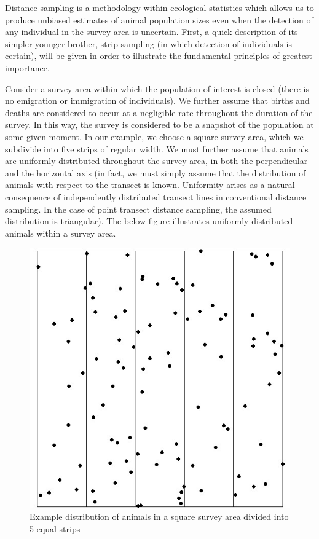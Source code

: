 \documentclass[11pt]{article}
\begin{document}
\begin{multicols}{2}
Distance sampling is a methodology within ecological statistics which allows us to produce unbiased estimates of animal population sizes even when the detection of any individual in the survey area is uncertain. First, a quick description of its simpler younger brother, strip sampling (in which detection of individuals is certain), will be given in order to illustrate the fundamental principles of greatest importance. 

Consider a survey area within which the population of interest is closed (there is no emigration or immigration of individuals). We further assume that births and deaths are considered to occur at a negligible rate throughout the duration of the survey. In this way, the survey is considered to be a snapshot of the population at some given moment. In our example, we choose a square survey area, which we subdivide into five strips of regular width. We must further assume that animals are uniformly distributed throughout the survey area, in both the perpendicular and the horizontal axis (in fact, we must simply assume that the distribution of animals with respect to the transect is known. Uniformity arises as a natural consequence of independently distributed transect lines in conventional distance sampling. In the case of point transect distance sampling, the assumed distribution is triangular). The below figure illustrates uniformly distributed animals within a survey area.
\begin{figure}[H]
\centering
\includegraphics[scale=0.5]{StripSampling}
\caption{Example distribution of animals in a square survey area divided into 5 equal strips}
\end{figure}


\end{multicols}
\end{document}
